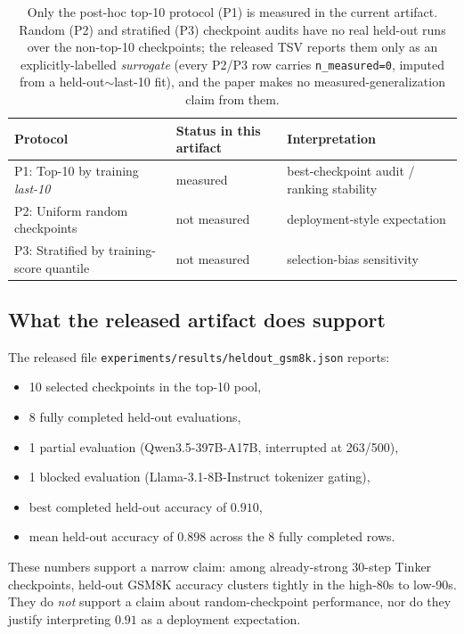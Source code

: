 \begin{table}[ht]
\centering
\small
\begin{tabular}{@{}lll@{}}
\toprule
\textbf{Protocol} & \textbf{Status in this artifact} & \textbf{Interpretation} \\
\midrule
P1: Top-10 by training \emph{last-10} & measured &
best-checkpoint audit / ranking stability \\
P2: Uniform random checkpoints & not measured &
deployment-style expectation \\
P3: Stratified by training-score quantile & not measured &
selection-bias sensitivity \\
\bottomrule
\end{tabular}
\caption{Only the post-hoc top-10 protocol (P1) is measured in the current
artifact. Random (P2) and stratified (P3) checkpoint audits have no real
held-out runs over the non-top-10 checkpoints; the released TSV reports them
only as an explicitly-labelled \emph{surrogate} (every P2/P3 row carries
\texttt{n\_measured=0}, imputed from a held-out$\sim$last-10 fit), and the paper
makes no measured-generalization claim from them.}
\label{tab:heldout-stratified}
\end{table}

\subsection{What the released artifact does support}

The released file \texttt{experiments/results/heldout\_gsm8k.json} reports:
\begin{itemize}[leftmargin=1.2em,itemsep=1pt]
  \item 10 selected checkpoints in the top-10 pool,
  \item 8 fully completed held-out evaluations,
  \item 1 partial evaluation (Qwen3.5-397B-A17B, interrupted at 263/500),
  \item 1 blocked evaluation (Llama-3.1-8B-Instruct tokenizer gating),
  \item best completed held-out accuracy of $0.910$,
  \item mean held-out accuracy of $0.898$ across the 8 fully completed rows.
\end{itemize}
These numbers support a narrow claim: among already-strong 30-step Tinker
checkpoints, held-out GSM8K accuracy clusters tightly in the high-80s to
low-90s. They do \emph{not} support a claim about random-checkpoint
performance, nor do they justify interpreting $0.91$ as a deployment
expectation.

